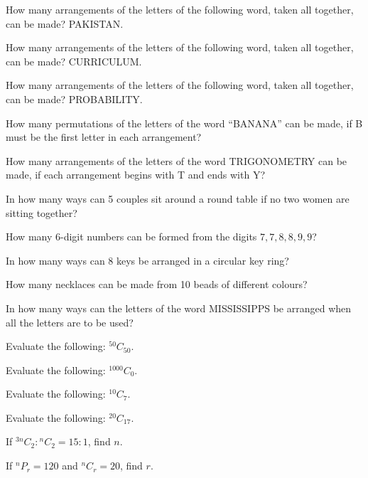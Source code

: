 \documentclass[11pt,a4paper]{article}
\begin{document}
\begin{shortlist}
\item How many arrangements of the letters of the following word, taken all together, can be made? PAKISTAN.

\item How many arrangements of the letters of the following word, taken all together, can be made? CURRICULUM.

\item How many arrangements of the letters of the following word, taken all together, can be made? PROBABILITY.

\item How many permutations of the letters of the word ``BANANA'' can be made, if B must be the first letter in each arrangement?

\item How many arrangements of the letters of the word TRIGONOMETRY can be made, if each arrangement begins with T and ends with Y?

\item In how many ways can 5 couples sit around a round table if no two women are sitting together?

\item How many 6-digit numbers can be formed from the digits $7,7,8,8,9,9$?

\item In how many ways can 8 keys be arranged in a circular key ring?

\item How many necklaces can be made from 10 beads of different colours?

\item In how many ways can the letters of the word MISSISSIPPS be arranged when all the letters are to be used?

\item Evaluate the following: ${}^{50}C_{50}$.

\item Evaluate the following: ${}^{1000}C_0$.

\item Evaluate the following: ${}^{10}C_7$.

\item Evaluate the following: ${}^{20}C_{17}$.

\item If ${}^{3n}C_2:{}^nC_2=15:1$, find $n$.

\item If ${}^nP_r=120$ and ${}^nC_r=20$, find $r$.


\end{shortlist}
\end{document}

